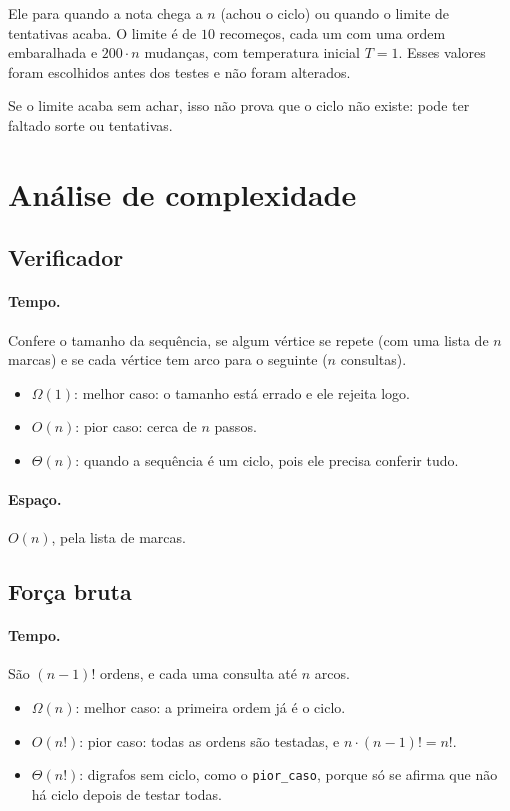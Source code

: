\documentclass[12pt,a4paper]{article}
\begin{document}
Ele para quando a nota chega a $n$ (achou o ciclo) ou quando o limite de tentativas acaba. O limite é de $10$ recomeços, cada um com uma ordem embaralhada e $200\cdot n$ mudanças, com temperatura inicial $T=1$. Esses valores foram escolhidos antes dos testes e não foram alterados.

Se o limite acaba sem achar, isso não prova que o ciclo não existe: pode ter faltado sorte ou tentativas.




\section{Análise de complexidade}
\label{sec:complexidade}

\subsection{Verificador}

\paragraph{Tempo.} Confere o tamanho da sequência, se algum vértice se repete (com uma lista de $n$ marcas) e se cada vértice tem arco para o seguinte ($n$ consultas).
\begin{itemize}
  \item $\Omega(1)$: melhor caso: o tamanho está errado e ele rejeita logo.
  \item $O(n)$: pior caso: cerca de $n$ passos.
  \item $\Theta(n)$: quando a sequência é um ciclo, pois ele precisa conferir tudo.
\end{itemize}

\paragraph{Espaço.} $O(n)$, pela lista de marcas.

\subsection{Força bruta}

\paragraph{Tempo.} São $(n-1)!$ ordens, e cada uma consulta até $n$ arcos.
\begin{itemize}
  \item $\Omega(n)$: melhor caso: a primeira ordem já é o ciclo.
  \item $O(n!)$: pior caso: todas as ordens são testadas, e $n\cdot(n-1)!=n!$.
  \item $\Theta(n!)$: digrafos sem ciclo, como o \texttt{pior\_caso}, porque só se afirma que não há ciclo depois de testar todas.
\end{itemize}
\end{document}
